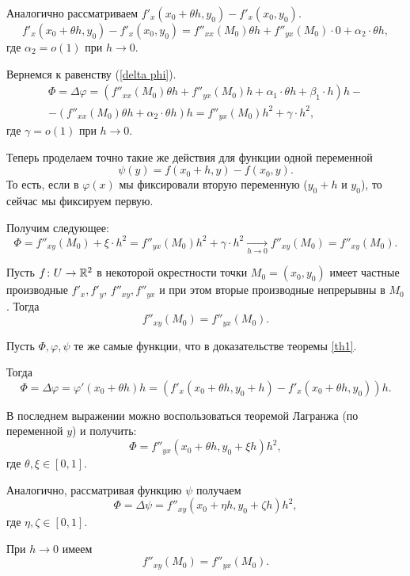 \begin{Proof}
		Аналогично рассматриваем $f'_x(x_0+\theta h, y_0) - f'_x(x_0, y_0)$. 
		$$
		f'_x(x_0+\theta h, y_0) - f'_x(x_0, y_0) = f''_{xx}(M_0)\theta h + f''_{yx}(M_0)\cdot 0 + \alpha_2 \cdot \theta h,
		$$
		где $\alpha_2 = o(1)$ при $h\to 0$.
		
		Вернемся к равенству (\ref{delta phi}).
		\begin{multline*}
		\Phi = \Delta \varphi = (f''_{xx}(M_0)\theta h + f''_{yx}(M_0)h + \alpha_1 \cdot \theta h + \beta_1  \cdot h)h - \\
		- (f''_{xx}(M_0)\theta h + \alpha_2 \cdot \theta h)h = f''_{yx}(M_0)h^2 + \gamma \cdot h^2,
		\end{multline*}
		где $\gamma = o(1)$ при $h\to0$.
		
		Теперь проделаем точно такие же действия для функции одной переменной
		$$
		\psi(y) = f(x_0+h, y)-f(x_0, y).
		$$
		То есть, если в $\varphi(x)$ мы фиксировали вторую переменную ($y_0+h$ и $y_0$), то сейчас мы фиксируем первую.
		
		Получим следующее:
		$$
		\Phi = f''_{xy}(M_0)+\xi \cdot h^2 = f''_{yx}(M_0)h^2 + \gamma \cdot h^2 \underset{h\to0}{\longrightarrow} f''_{xy}(M_0) = f''_{xy}(M_0).
		$$
	\end{Proof}

	\begin{theorem}
		Пусть $f\colon U \to \mathbb{R}^2$ в некоторой окрестности точки $M_0 = (x_0, y_0)$ имеет частные производные $f'_x, f'_y$, $f''_{xy}, f''_{yx}$ и при этом вторые производные непрерывны в $M_0$.
		Тогда
		$$
		f''_{xy}(M_0) = f''_{yx}(M_0).
		$$
	\end{theorem}
	\begin{Proof}
		Пусть $\Phi, \varphi, \psi$ те же самые функции, что в доказательстве теоремы \ref{th1}.
		
		Тогда 
		$$
		\Phi = \Delta\varphi = \varphi'(x_0+\theta h)h = (f'_x(x_0+\theta h, y_0+h) - f'_x(x_0+\theta h, y_0))h.
		$$
		
		В последнем выражении можно воспользоваться теоремой Лагранжа (по переменной $y$) и получить:
		$$
		\Phi = f''_{yx}(x_0 + \theta h, y_0 + \xi h)h^2,
		$$
		где $\theta, \xi \in [0,1]$.
		
		Аналогично, рассматривая функцию $\psi$ получаем
		$$
		\Phi = \Delta\psi = f''_{xy}(x_0+\eta h, y_0 + \zeta h)h^2,
		$$
		где $\eta, \zeta \in [0,1]$.
		
		При $h\to 0$ имеем 
		$$
		f''_{xy}(M_0) = f''_{yx}(M_0).
		$$
	\end{Proof}

